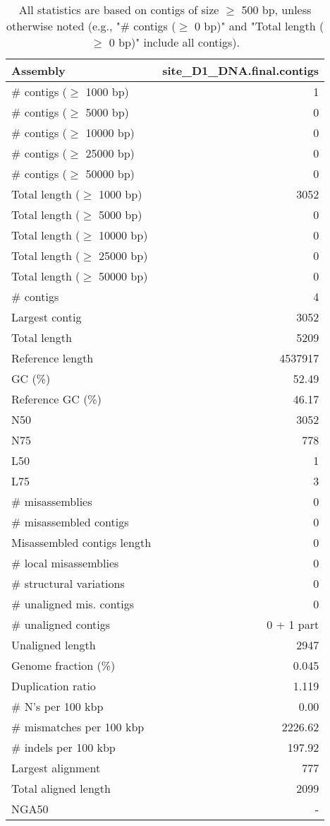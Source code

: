\documentclass[12pt,a4paper]{article}
\begin{document}
\begin{table}[ht]
\begin{center}
\caption{All statistics are based on contigs of size $\geq$ 500 bp, unless otherwise noted (e.g., "\# contigs ($\geq$ 0 bp)" and "Total length ($\geq$ 0 bp)" include all contigs).}
\begin{tabular}{|l*{1}{|r}|}
\hline
Assembly & site\_D1\_DNA.final.contigs \\ \hline
\# contigs ($\geq$ 1000 bp) & 1 \\ \hline
\# contigs ($\geq$ 5000 bp) & 0 \\ \hline
\# contigs ($\geq$ 10000 bp) & 0 \\ \hline
\# contigs ($\geq$ 25000 bp) & 0 \\ \hline
\# contigs ($\geq$ 50000 bp) & 0 \\ \hline
Total length ($\geq$ 1000 bp) & 3052 \\ \hline
Total length ($\geq$ 5000 bp) & 0 \\ \hline
Total length ($\geq$ 10000 bp) & 0 \\ \hline
Total length ($\geq$ 25000 bp) & 0 \\ \hline
Total length ($\geq$ 50000 bp) & 0 \\ \hline
\# contigs & 4 \\ \hline
Largest contig & 3052 \\ \hline
Total length & 5209 \\ \hline
Reference length & 4537917 \\ \hline
GC (\%) & 52.49 \\ \hline
Reference GC (\%) & 46.17 \\ \hline
N50 & 3052 \\ \hline
N75 & 778 \\ \hline
L50 & 1 \\ \hline
L75 & 3 \\ \hline
\# misassemblies & 0 \\ \hline
\# misassembled contigs & 0 \\ \hline
Misassembled contigs length & 0 \\ \hline
\# local misassemblies & 0 \\ \hline
\# structural variations & 0 \\ \hline
\# unaligned mis. contigs & 0 \\ \hline
\# unaligned contigs & 0 + 1 part \\ \hline
Unaligned length & 2947 \\ \hline
Genome fraction (\%) & 0.045 \\ \hline
Duplication ratio & 1.119 \\ \hline
\# N's per 100 kbp & 0.00 \\ \hline
\# mismatches per 100 kbp & 2226.62 \\ \hline
\# indels per 100 kbp & 197.92 \\ \hline
Largest alignment & 777 \\ \hline
Total aligned length & 2099 \\ \hline
NGA50 & - \\ \hline
\end{tabular}
\end{center}
\end{table}
\end{document}
